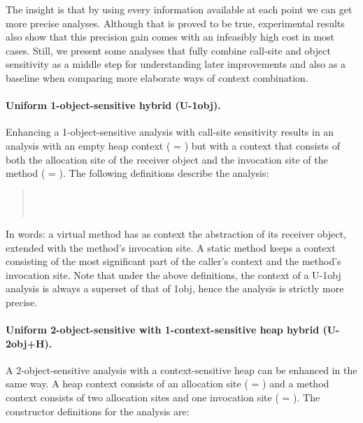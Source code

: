 The insight is that by using every information available at each point we can get more precise analyses. Although that is proved to be true, experimental results also show that this precision gain comes with an infeasibly high cost in most cases. Still, we present some analyses that fully combine call-site and object sensitivity as a middle step for understanding later improvements and also as a baseline when comparing more elaborate ways of context combination.

\paragraph[Uniform 1-object-sensitive]{Uniform 1-object-sensitive hybrid (U-1obj).}
Enhancing a 1-object-sensitive analysis with call-site sensitivity results in an analysis with an empty heap context ( = \args{\{$\star$\}}) but with a context that consists of both the allocation site of the receiver object and the invocation site of the method ( = ). The following definitions describe the analysis:

\begin{quote}
 \\
 \\
\end{quote}

In words: a virtual method has as context the abstraction of its receiver object, extended with the method's invocation site.  A static method keeps a context consisting of the most significant part of the caller's context and the method's invocation site. Note that under the above definitions, the context of a U-1obj analysis is always a superset of that of 1obj, hence the analysis is strictly more precise.

\paragraph[Uniform 2-object-sensitive with 1-context-sensitive heap]{Uniform 2-object-sensitive with 1-context-sensitive heap hybrid (U-2obj+H).}
A 2-object-sensitive analysis with a context-sensitive heap can be enhanced in the same way. A heap context consists of an allocation site ( = ) and a method context consists of two allocation sites and one invocation site ( = ).  The constructor definitions for the analysis are:

